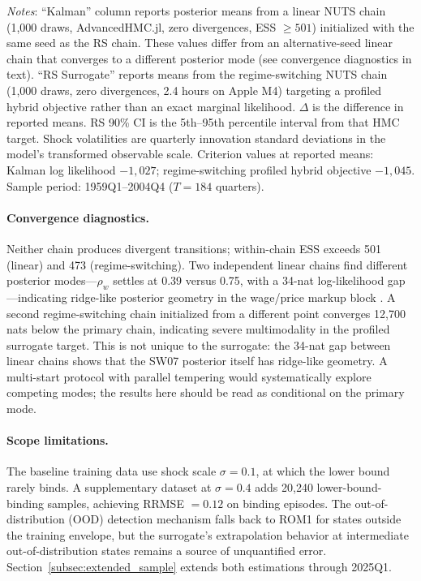 \documentclass[12pt]{article}
\theoremstyle{plain}
\theoremstyle{definition}
\theoremstyle{remark}
\newcommand{\tablenotes}[1]{%
  \par\vspace{0.5em}%
  \noindent\begin{minipage}{\textwidth}%
  \raggedright\footnotesize #1%
  \end{minipage}\par%
}
\begin{document}
\begin{table}[htbp]
\begin{tabular}{llrrrr}
\bottomrule
\end{tabular}
\tablenotes{\textit{Notes}: ``Kalman'' column reports posterior means from a linear NUTS chain (1,000 draws, AdvancedHMC.jl, zero divergences, ESS $\geq 501$) initialized with the same seed as the RS chain. These values differ from an alternative-seed linear chain that converges to a different posterior mode (see convergence diagnostics in text). ``RS Surrogate'' reports means from the regime-switching NUTS chain (1,000 draws, zero divergences, 2.4 hours on Apple M4) targeting a profiled hybrid objective rather than an exact marginal likelihood. $\Delta$ is the difference in reported means. RS 90\% CI is the 5th--95th percentile interval from that HMC target. Shock volatilities are quarterly innovation standard deviations in the model's transformed observable scale. Criterion values at reported means: Kalman log likelihood $-1{,}027$; regime-switching profiled hybrid objective $-1{,}045$. Sample period: 1959Q1--2004Q4 ($T=184$ quarters).}
\end{table}

\paragraph{Convergence diagnostics.} Neither chain produces divergent transitions; within-chain ESS exceeds 501 (linear) and 473 (regime-switching). Two independent linear chains find different posterior modes---$\rho_w$ settles at 0.39 versus 0.75, with a 34-nat log-likelihood gap---indicating ridge-like posterior geometry in the wage/price markup block \citep{herbst2016sequential}. A second regime-switching chain initialized from a different point converges 12,700 nats below the primary chain, indicating severe multimodality in the profiled surrogate target. This is not unique to the surrogate: the 34-nat gap between linear chains shows that the SW07 posterior itself has ridge-like geometry. A multi-start protocol with parallel tempering \citep{herbst2019tempered} would systematically explore competing modes; the results here should be read as conditional on the primary mode.

\paragraph{Scope limitations.} The baseline training data use shock scale $\sigma = 0.1$, at which the lower bound rarely binds. A supplementary dataset at $\sigma = 0.4$ adds 20,240 lower-bound-binding samples, achieving RRMSE $= 0.12$ on binding episodes. The out-of-distribution (OOD) detection mechanism falls back to ROM1 for states outside the training envelope, but the surrogate's extrapolation behavior at intermediate out-of-distribution states remains a source of unquantified error. Section~\ref{subsec:extended_sample} extends both estimations through 2025Q1.
\end{document}
